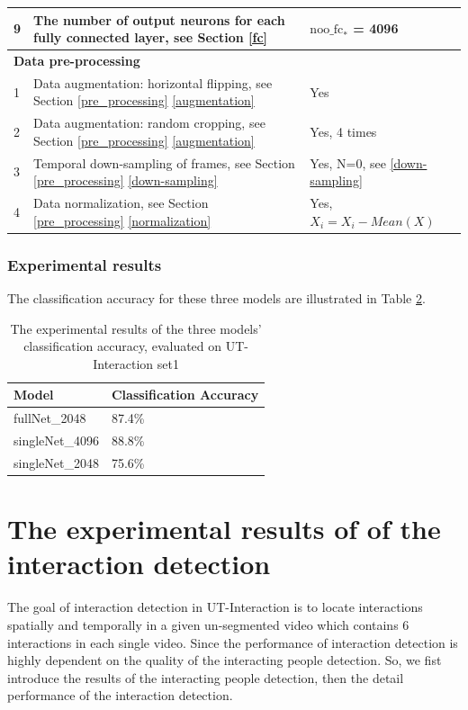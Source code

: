 \begin{table}
\begin{center}
\begin{tabular}{| m{0.6cm} | m{7cm} | m{6cm} |}
			9 &  The number of output neurons for each fully connected layer, see Section \ref{fc} & \(\text{noo\_fc}_*\) = 4096 \\ \hline \hline                           
			
			\multicolumn{3}{|l|}{\textbf{Data pre-processing}}  \\ \hline
			1 & Data augmentation: horizontal flipping, see Section \ref{pre_processing} \ref{augmentation} & Yes  \\ \hline
			2 & Data augmentation: random cropping, see Section \ref{pre_processing} \ref{augmentation} & Yes, 4 times \\ \hline
			3 & Temporal down-sampling of frames, see Section \ref{pre_processing} \ref{down-sampling} & Yes, N=0, see \ref{down-sampling} \\ \hline
			
			4 & Data normalization, see Section \ref{pre_processing} \ref{normalization} & Yes, \(X_i = X_i - Mean(X)\) \\ \hline			
		\end{tabular}
		\label{table:network_settings}
	\end{center}
\end{table} 
\subsubsection*{Experimental results}
The classification accuracy for these three models are illustrated in Table \ref{table:threeModels}.

\begin{table}
	\caption{The experimental results of the three models' classification accuracy, evaluated on UT-Interaction set1}
	\begin{center}
		\begin{tabular}{| m{4cm} | m{4cm} |}
			\hline
			Model & Classification Accuracy \\ \hline \hline
			fullNet\_2048 & 87.4\%   \\ \hline
			singleNet\_4096 & 88.8\% \\ \hline
			singleNet\_2048 & 75.6\%  \\ \hline				
		\end{tabular}
		\label{table:threeModels}
	\end{center}
\end{table}

\section{The experimental results of of the interaction detection}
The goal of interaction detection in UT-Interaction is to locate interactions spatially and temporally in a given un-segmented video which contains 6 interactions in each single video. Since the performance of interaction detection is highly dependent on the quality of  the interacting people detection. So, we fist introduce the results of the interacting people detection, then the detail performance of the interaction detection.     

